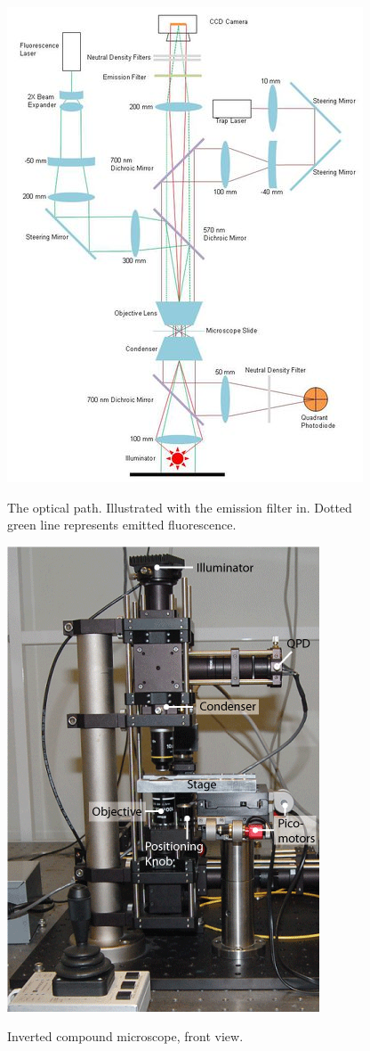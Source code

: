 \documentclass{../lab}
\begin{document}
\begin{figure}[h]
    \centering
    \href{http://experimentationlab.berkeley.edu/sites/default/files/images/400px-Graphic1.jpg}{\includegraphics[width=0.5\linewidth]{images/400px-Graphic1.jpg}}
    \caption{The optical path. Illustrated with the emission filter in. Dotted green line represents emitted fluorescence.}
    \label{fig:400px-Graphic1}
\end{figure}

\begin{figure}[h]
    \centering
    \href{http://experimentationlab.berkeley.edu/sites/default/files/images/OTZ_From_Front.gif}{\includegraphics[width=0.5\linewidth]{images/OTZ_From_Front.png}}
    \caption{Inverted compound microscope, front view.}
    \label{fig:OTZ_From_Front}
\end{figure}
\end{document}
